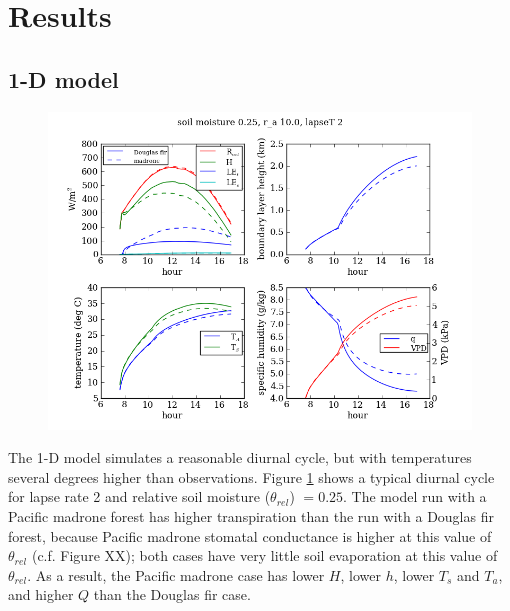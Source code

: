 \linespread{1.6}\selectfont

\section{Results}

\subsection{1-D model}

\begin{figure}[here]
\includegraphics[width=1\textwidth]{ch2-BL/figures/testall_Aug15_soilm0pt25_ra10_lapseT2.png}
\caption{}
\label{fig:BL_1Ddiurnal}
\end{figure}

The 1-D model simulates a reasonable diurnal cycle, but with temperatures several degrees higher than observations.  Figure \ref{fig:BL_1Ddiurnal} shows a typical diurnal cycle for lapse rate 2 and relative soil moisture ($\theta_{rel}$) $= 0.25$.  The model run with a Pacific madrone forest has higher transpiration than the run with a Douglas fir forest, because Pacific madrone stomatal conductance is higher at this value of $\theta_{rel}$ (c.f. Figure XX); both cases have very little soil evaporation at this value of $\theta_{rel}$.  As a result, the Pacific madrone case has lower $H$, lower $h$, lower $T_s$ and $T_a$, and higher $Q$ than the Douglas fir case.

